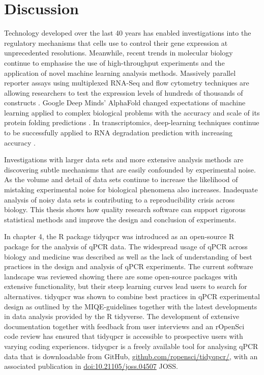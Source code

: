 \documentclass[../main.tex]{subfiles}
\begin{document}
\chapter{{Discussion}}
\onehalfspacing

Technology developed over the last 40 years has enabled investigations into the regulatory mechanisms that cells use to control their gene expression at unprecedented resolutions.
Meanwhile, recent trends in molecular biology continue to emphasise the use of high-throughput experiments and the application of novel machine learning analysis methods.
Massively parallel reporter assays using multiplexed RNA-Seq and flow cytometry techniques are allowing researchers to test the expression levels of hundreds of thousands of constructs \parencite{Sharon2012, Shalem2015, Klein2020}.
Google Deep Minds' AlphaFold changed expectations of machine learning applied to complex biological problems with the accuracy and scale of its protein folding predictions \parencite{Jumper2021}.
In transcriptomics, deep-learning techniques continue to be successfully applied to RNA degradation prediction with increasing accuracy \parencite{WaymentSteele2022, He2023}.

Investigations with larger data sets and more extensive analysis methods are discovering subtle mechanisms that are easily confounded by experimental noise.
As the volume and detail of data sets continue to increase the likelihood of mistaking experimental noise for biological phenomena also increases.
Inadequate analysis of noisy data sets is contributing to a reproducibility crisis across biology.
This thesis shows how quality research software can support rigorous statistical methods and improve the design and conclusion of experiments.

In chapter 4, the R package tidyqpcr was introduced as an open-source R package for the analysis of qPCR data. 
The widespread usage of qPCR across biology and medicine was described as well as the lack of understanding of best practices in the design and analysis of qPCR experiments.
The current software landscape was reviewed showing there are some open-source packages with extensive functionality, but their steep learning curves lead users to search for alternatives.
tidyqpcr was shown to combine best practices in qPCR experimental design as outlined by the MIQE-guidelines together with the latest developments in data analysis provided by the R tidyverse.
The development of extensive documentation together with feedback from user interviews and an rOpenSci code review has ensured that tidyqpcr is accessible to prospective users with varying coding experiences. 
tidyqpcr is a freely available tool for analysing qPCR data that is downloadable from GitHub, \href{https://github.com/ropensci/tidyqpcr/}{github.com/ropensci/tidyqpcr/}, with an associated publication in \href{https://joss.theoj.org/papers/10.21105/joss.04507}{doi:10.21105/joss.04507} JOSS.
\end{document}
